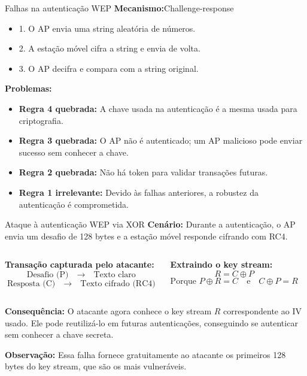 \begin{frame}{Falhas na autenticação WEP}
\textbf{Mecanismo:}Challenge-response  \begin{itemize}

    \item 1. O AP envia uma string aleatória de números.  
    \item 2. A estação móvel cifra a string e envia de volta.  
    \item 3. O AP decifra e compara com a string original.  

\end{itemize}
\bigskip
\textbf{Problemas:}
\begin{itemize}
    \item \textbf{Regra 4 quebrada:} A chave usada na autenticação é a mesma usada para criptografia.
    \item \textbf{Regra 3 quebrada:} O AP não é autenticado; um AP malicioso pode enviar sucesso sem conhecer a chave.
    \item \textbf{Regra 2 quebrada:} Não há token para validar transações futuras.  
    \item \textbf{Regra 1 irrelevante:} Devido às falhas anteriores, a robustez da autenticação é comprometida.
\end{itemize}
\end{frame}


\begin{frame}{Ataque à autenticação WEP via XOR}
\textbf{Cenário:} Durante a autenticação, o AP envia um desafio de 128 bytes e a estação móvel responde cifrando com RC4.

\begin{columns}[t]
\textbf{Transação capturada pelo atacante:}
\[
\text{Desafio (P)} \quad \rightarrow \quad \text{Texto claro}
\]
\[
\text{Resposta (C)} \quad \rightarrow \quad \text{Texto cifrado (RC4)}
\]

\textbf{Extraindo o key stream:}
\[
R = C \oplus P
\]
\[
\text{Porque } P \oplus R = C \quad \text{e} \quad C \oplus P = R
\]
\end{columns}

\bigskip
\textbf{Consequência:}  
O atacante agora conhece o key stream \(R\) correspondente ao IV usado. Ele pode reutilizá-lo em futuras autenticações, conseguindo se autenticar sem conhecer a chave secreta.  

\textbf{Observação:} Essa falha fornece gratuitamente ao atacante os primeiros 128 bytes do key stream, que são os mais vulneráveis.
\end{frame}

